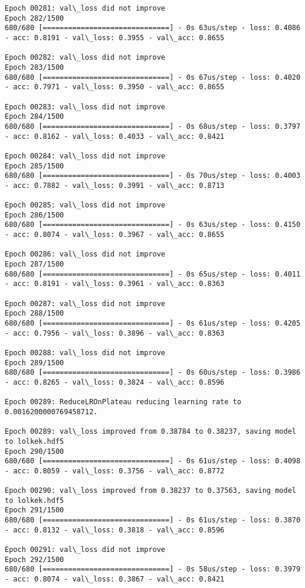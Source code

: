\documentclass[11pt]{article}
\begin{document}
\begin{Verbatim}[commandchars=\\\{\}]
Epoch 00281: val\_loss did not improve
Epoch 282/1500
680/680 [==============================] - 0s 63us/step - loss: 0.4086 - acc: 0.8191 - val\_loss: 0.3955 - val\_acc: 0.8655

Epoch 00282: val\_loss did not improve
Epoch 283/1500
680/680 [==============================] - 0s 67us/step - loss: 0.4020 - acc: 0.7971 - val\_loss: 0.3950 - val\_acc: 0.8655

Epoch 00283: val\_loss did not improve
Epoch 284/1500
680/680 [==============================] - 0s 68us/step - loss: 0.3797 - acc: 0.8162 - val\_loss: 0.4033 - val\_acc: 0.8421

Epoch 00284: val\_loss did not improve
Epoch 285/1500
680/680 [==============================] - 0s 70us/step - loss: 0.4003 - acc: 0.7882 - val\_loss: 0.3991 - val\_acc: 0.8713

Epoch 00285: val\_loss did not improve
Epoch 286/1500
680/680 [==============================] - 0s 63us/step - loss: 0.4150 - acc: 0.8074 - val\_loss: 0.3967 - val\_acc: 0.8655

Epoch 00286: val\_loss did not improve
Epoch 287/1500
680/680 [==============================] - 0s 65us/step - loss: 0.4011 - acc: 0.8191 - val\_loss: 0.3961 - val\_acc: 0.8363

Epoch 00287: val\_loss did not improve
Epoch 288/1500
680/680 [==============================] - 0s 61us/step - loss: 0.4205 - acc: 0.7956 - val\_loss: 0.3896 - val\_acc: 0.8363

Epoch 00288: val\_loss did not improve
Epoch 289/1500
680/680 [==============================] - 0s 60us/step - loss: 0.3986 - acc: 0.8265 - val\_loss: 0.3824 - val\_acc: 0.8596

Epoch 00289: ReduceLROnPlateau reducing learning rate to 0.0016200000769458712.

Epoch 00289: val\_loss improved from 0.38784 to 0.38237, saving model to lolkek.hdf5
Epoch 290/1500
680/680 [==============================] - 0s 61us/step - loss: 0.4098 - acc: 0.8059 - val\_loss: 0.3756 - val\_acc: 0.8772

Epoch 00290: val\_loss improved from 0.38237 to 0.37563, saving model to lolkek.hdf5
Epoch 291/1500
680/680 [==============================] - 0s 61us/step - loss: 0.3870 - acc: 0.8132 - val\_loss: 0.3818 - val\_acc: 0.8596

Epoch 00291: val\_loss did not improve
Epoch 292/1500
680/680 [==============================] - 0s 58us/step - loss: 0.3979 - acc: 0.8074 - val\_loss: 0.3867 - val\_acc: 0.8421


\end{Verbatim}
\end{document}

